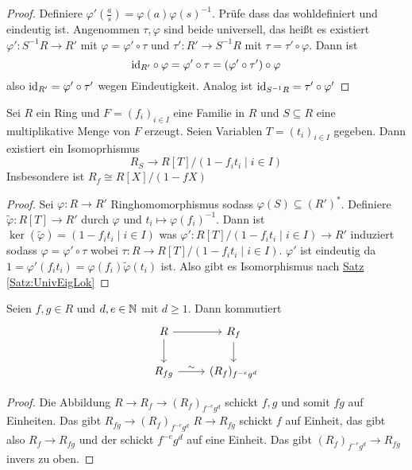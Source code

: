 \begin{proof}
    Definiere $\varphi'(\frac a s)=\varphi(a)\varphi(s)^{-1}$. Prüfe dass das wohldefiniert und eindeutig ist. 
    Angenommen $\tau,\varphi$ sind beide universell, das heißt es existiert $\varphi'\colon S^{-1}R\to R'$ mit $\varphi=\varphi'\circ\tau$ und $\tau'\colon R'\to S^{-1}R$ mit $\tau=\tau'\circ \varphi$.
    Dann ist 
    $$\mathrm{id}_{R'}\circ \varphi=\varphi'\circ \tau=(\varphi'\circ \tau')\circ \varphi$$ also $\mathrm{id}_{R'}=\varphi'\circ\tau'$ wegen Eindeutigkeit. Analog ist $\mathrm{id}_{S^{-1}R}=\tau'\circ\varphi'$
\end{proof}
\begin{Lemma}
    Sei $R$ ein Ring und $F=(f_i)_{i\in I}$ eine Familie in $R$ und $S\subseteq R$ eine multiplikative Menge von $F$ erzeugt. Seien Variablen $T=(t_i)_{i\in I}$ gegeben.
    Dann existiert ein Isomoprhismus 
    $$R_S\to R[T]/(1-f_it_i\mid i\in I)$$
    Insbesondere ist $R_f\cong R[X]/(1-fX)$
\end{Lemma}
\begin{proof}
    Sei $\varphi:R\to R'$ Ringhomomorphismus sodass $\varphi(S)\subseteq (R')^*$. Definiere $\tilde\varphi\colon R[T]\to R'$ durch $\varphi$ und $t_i\mapsto \varphi(f_i)^{-1}$.
    Dann ist $\ker(\tilde\varphi)=(1-f_it_i\mid i\in I)$ was $\varphi':R[T]/(1-f_it_i\mid i\in I)\to R'$ induziert sodass $\varphi=\varphi'\circ\tau$ wobei $\tau:R\to R[T]/(1-f_it_i\mid i\in I)$.
    $\varphi'$ ist eindeutig da $1=\varphi'(f_it_i)=\varphi(f_i)\tilde\varphi(t_i)$ ist. Also gibt es Isomorphismus nach \hyperref[Satz:UnivEigLok]{Satz \ref{Satz:UnivEigLok}}
\end{proof}
\begin{Satz}\label{Satz:EigLok}
    Seien $f,g\in R$ und $d,e\in\mathbb{N}$ mit $d\geq 1$. Dann kommutiert $$%
\begin{tikzcd}
R \arrow[d] \arrow[r]    & R_f \arrow[d]     \\
R_{fg} \arrow[r, "\sim"] & (R_f)_{f^{-e}g^d}
\end{tikzcd}$$
\end{Satz}
\begin{proof}
    Die Abbildung $R\to R_f\to (R_f)_{f^{-e}g^d}$ schickt $f,g$ und somit $fg$ auf Einheiten. 
    Das gibt $R_{fg}\to (R_f)_{f^{-e}g^d}$
    $R\to R_{fg}$ schickt $f$ auf Einheit, das gibt also $R_f\to R_{fg}$ und der schickt $f^{-e}g^d$ auf eine Einheit. Das gibt $(R_f)_{f^{-e}g^d}\to R_{fg}$ invers zu oben.
\end{proof}
